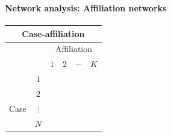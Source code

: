\documentclass[8pt]{beamer}
\begin{document}
\begin{frame}[fragile]
\begin{columns}[c]
\begin{minipage}[c][.5\textheight][c]{\linewidth}
\end{minipage}

\end{columns}


\end{frame}


\begin{frame}
\frametitle{\insertsection}
\framesubtitle{Network analysis: Affiliation networks}


\centering
\footnotesize
\centering
\begin{tabular}{lccccc}
\multicolumn{6}{c}{Case-affiliation {\color{blue}{adjacency matrix}}}\\
\toprule
        &        &\multicolumn{4}{c}{Affiliation}\\
 
        &        & $1$ & $2$ & $\cdots$ & $K$\\
\hline
        &    $1$           \\
        &    $2$           \\
Case    &    $\vdots$      \\
        &    $N$           \\
\bottomrule
\end{tabular}


\medskip
\medskip
\medskip
\medskip

\begin{columns}[c]
\footnotesize
\centering
{}


\footnotesize
\centering
{}
\end{columns}
\end{frame}
\end{document}
